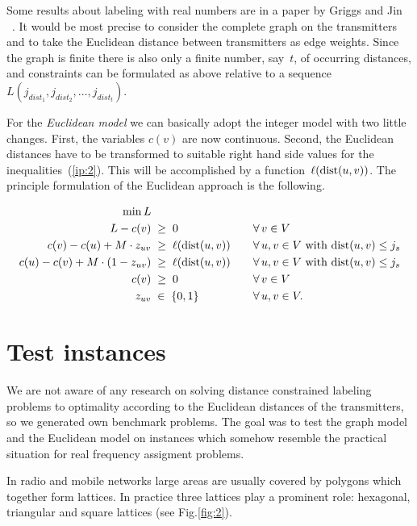 \documentclass[smallextended]{svjour3}
\def\dist{\mathop{\rm dist}}
\begin{document}
Some results about labeling with real numbers are in a paper by Griggs and Jin ~\cite{13}. 
It would be most precise to consider the complete graph on the 
transmitters and to take the Euclidean distance between transmitters 
as edge weights. Since the graph is finite there is also only a finite 
number, say~$t$, of occurring distances, and constraints can be formulated as above 
relative to a sequence $L(j_{dist_{1}},j_{dist_{2}},\ldots ,j_{dist_{t}})$. 

For the \emph{Euclidean model} we can basically adopt the integer model 
with two little changes. First, the variables $c(v)$ are now continuous. 
Second, the Euclidean distances have to be transformed to suitable right hand 
side values for the inequalities~(\ref{ip:2}). This will be accomplished by a 
function~$\ell(\dist(u,v))$. The principle formulation of the Euclidean approach is the following. 

\begin{alignat}{2} 
\min L      &                            & \quad & \notag\\ 
L-c(v)       &\;\ge\;0                    & \quad &\forall\, v\in V\notag\\ 
c(v)-c(u)+M\cdot z_{uv}     &\;\geq\;\ell(\dist(u,v)) & \quad& \forall\, u,v\in V\text{ with }{\dist(u,v)}\le j_s\notag\\ 
c(u)-c(v)+M\cdot(1-z_{uv}) &\;\geq\;\ell(\dist(u,v)) &   &\forall\, u,v\in V\text{ with }{\dist(u,v)}\le j_s\notag\\ 
c(v)          &\;\geq\;0                  & &\forall\, v\in V \notag\\ 
z_{uv}                                &\;\in\;\{0,1\}              &  & \forall\, u,v\in V.\notag 
\end{alignat} 

\section{Test instances} 

We are not aware of any research on solving distance constrained labeling problems 
to optimality according to the Euclidean distances of the transmitters, so we generated own benchmark problems. The goal was to test the 
graph model and the Euclidean model on instances which somehow resemble the practical 
situation for real frequency assigment problems. 

In radio and mobile networks large areas are usually covered by polygons 
which together form lattices. In practice three lattices play a prominent 
role: hexagonal, triangular and square lattices (see Fig.\ref{fig:2}). 
\end{document}
